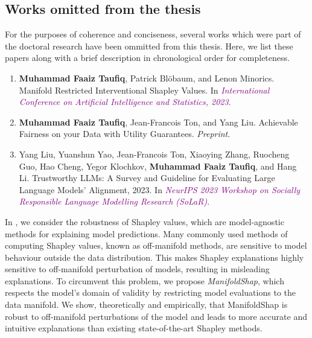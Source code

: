 \subsection{Works omitted from the thesis}
For the purposes of coherence and conciseness, several works which were part of the doctoral research have been ommitted from this thesis. 
Here, we list these papers along with a brief description in chronological order for completeness. 
\begin{enumerate}
    \item \textbf{Muhammad Faaiz Taufiq}, Patrick Blöbaum, and Lenon Minorics. Manifold Restricted
    Interventional Shapley Values. In \textit{\textcolor{purple}{International Conference on Artificial Intelligence and
    Statistics, 2023}}.  \citep{taufiq2023manifold}
    \item  \textbf{Muhammad Faaiz Taufiq}, Jean-Francois Ton, and Yang Liu. Achievable Fairness on your Data
    with Utility Guarantees. \textit{Preprint}. \citep{taufiq2024achievablefairnessdatautility}
    \item Yang Liu, Yuanshun Yao, Jean-Francois Ton, Xiaoying Zhang, Ruocheng Guo, Hao Cheng, Yegor
    Klochkov, \textbf{Muhammad Faaiz Taufiq}, and Hang Li. 
    Trustworthy LLMs: A Survey and Guideline for Evaluating Large Language Models' Alignment, 2023. 
    In \textit{\textcolor{purple}{NeurIPS 2023 Workshop on Socially Responsible Language Modelling Research (SoLaR)}}.    
    \citep{liu2024trustworthyllmssurveyguideline}
\end{enumerate}
In \cite{taufiq2023manifold}, we consider the robustness of Shapley values, which are model-agnostic methods for explaining model predictions.
Many commonly used methods of computing Shapley values, known as off-manifold methods, are sensitive to model behaviour outside the data distribution.
This makes Shapley explanations highly sensitive to off-manifold perturbation of models, resulting in misleading explanations.
To circumvent this problem, we propose \emph{ManifoldShap}, which respects the model’s domain of validity by restricting model evaluations to the data manifold.
We show, theoretically and empirically, that ManifoldShap is robust to off-manifold perturbations of the model and leads to
more accurate and intuitive explanations than existing state-of-the-art Shapley methods.

